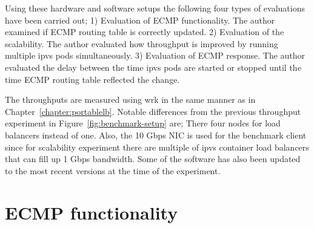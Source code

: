 Using these hardware and software setups the following four types of evaluations have been carried out;
1) Evaluation of ECMP functionality. The author examined if ECMP routing table is correctly updated.
2) Evaluation of the scalability. The author evaluated how throughput is improved by running multiple ipvs pods simultaneously.
3) Evaluation of ECMP response. The author evaluated the delay between the time ipvs pods are started or stopped until the time ECMP routing table reflected the change.


The throughputs are measured using wrk in the same manner as in Chapter~\ref{chapter:portablelb}.
Notable differences from the previous throughput experiment in Figure~\ref{fig:benchmark-setup} are;
There four nodes for load balancers instead of one.
Also, the 10 Gbps NIC is used for the benchmark client since for scalability experiment there are multiple of ipvs container load balancers that can fill up 1 Gbps bandwidth.
Some of the software has also been updated to the most recent versions at the time of the experiment.

\FloatBarrier

\section{ECMP functionality}

